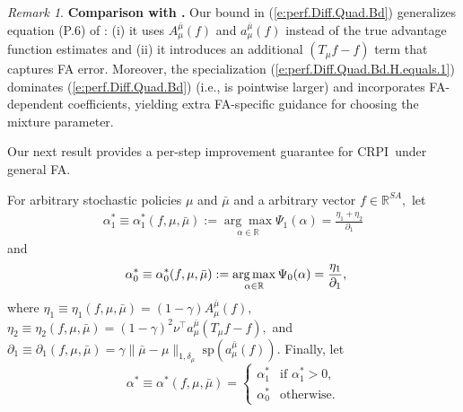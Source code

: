\documentclass[twoside]{article}
\theoremstyle{plain}
\theoremstyle{definition}
\theoremstyle{remark}
\newtheorem{remark}[theorem]{Remark}
\renewcommand{\sp}{\mathrm{sp}}
\newcommand{\tr}{\top}
\newcommand{\bR}{\mathbb{R}}
\newcommand{\mub}{\bar{\mu}}
\newcommand{\alS}{\alpha^*}
\newcommand{\CRPI}{CRPI}
\renewcommand{\eqref}[1]{(\ref{#1})}
\begin{document}
%
\begin{remark} 
    \textbf{Comparison with \citep{metelli2021safe}.}
   Our bound in \eqref{e:perf.Diff.Quad.Bd} generalizes equation (P.6) of \citep{metelli2021safe}: (i) it uses $A_{\mu}^{\mub}(f)$ and $a_{\mu}^{\mub}(f)$ instead of the true  advantage function estimates and (ii) it introduces an additional $(T_{\mu} f - f)$ term that captures FA error. Moreover, the specialization \eqref{e:perf.Diff.Quad.Bd.H.equals.1} dominates \eqref{e:perf.Diff.Quad.Bd} (i.e., is pointwise larger) and incorporates FA-dependent coefficients, yielding extra FA-specific guidance for choosing the mixture parameter.
\end{remark}

Our next result provides a per-step improvement guarantee for \CRPI\  under general FA. 

For arbitrary stochastic policies $\mu$ and $\mub$ and a arbitrary vector $f \in \bR^{SA},$ let
%
\begin{equation}
    \begin{aligned}
        \alS_1 \equiv \alS_1(f, \mu, \mub) := \underset{\alpha \in \bR}{\arg\max}  \Psi_1(\alpha)      = \frac{\eta_1 + \eta_2}{\partial_1}
    \end{aligned}
\end{equation}
%
and
%
\begin{equation}
    \begin{aligned}
        \alS_0 \equiv \alS_0(f, \mu, \mub) := {} & \underset{\alpha \in \bR}{\arg\max}\,  \Psi_0(\alpha) = \frac{\eta_1}{\partial_1},\hspace{-1.5em}
    \end{aligned}
\end{equation}
%
where $\eta_1 \equiv \eta_1(f, \mu, \mub) = (1 - \gamma)  A_{\mu}^{\mub}(f),$ $\eta_2 \equiv \eta_2(f, \mu, \mub) = (1 - \gamma)^2 \nu^\tr a_{\mu}^{\mub}(T_{\mu}f - f),$ and $\partial_1 \equiv \partial_1(f, \mu, \mub) = \gamma \|\mub - \mu\|_{1, \delta_{\mu}}\  \sp(a_{\mu}^{\mub} (f)).$
%
Finally, let 
%
\begin{equation}
    \label{e:alS.defn}
    \alS \equiv \alS(f, \mu, \mub) = 
    \begin{cases}
        \alS_1 & \text{if } \alS_1 > 0, \\
        \alS_0 & \text{otherwise}.
    \end{cases}
\end{equation}
\end{document}
